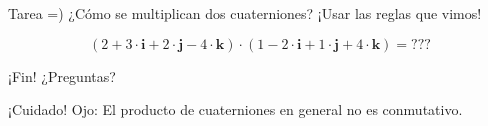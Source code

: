 \documentclass[10pt]{beamer}
\def\R{\mathbb{R}}
\def\ii{\textbf{i}}
\def\jj{\textbf{j}}
\def\kk{\textbf{k}}
\begin{document}
\begin{frame}{Tarea =)}
	¿Cómo se multiplican dos cuaterniones? ¡Usar las reglas que vimos! \bigskip
	
	$$(2+3\cdot \ii + 2 \cdot \jj - 4 \cdot \kk) \cdot (1-2\cdot \ii + 1 \cdot \jj + 4 \cdot \kk) = \text{???}$$
	
	
\end{frame}

\begin{frame}{¡Fin!}
\Huge ¿Preguntas?
\end{frame}



\begin{frame}{¡Cuidado!}
Ojo: El producto de cuaterniones en general no es conmutativo.


	
	
	
	
\end{frame}
\end{document}
